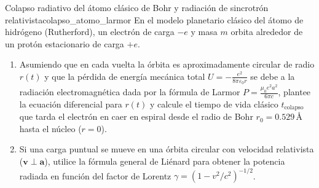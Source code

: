 \documentclass[11pt,a4paper]{book}
\begin{document}
\begin{ejercicio}{Colapso radiativo del átomo clásico de Bohr y radiación de sincrotrón relativista}{colapso_atomo_larmor}
En el modelo planetario clásico del átomo de hidrógeno (Rutherford), un electrón de carga $-e$ y masa $m$ orbita alrededor de un protón estacionario de carga $+e$.
\begin{enumerate}[label=\alph*)]
    \item Asumiendo que en cada vuelta la órbita es aproximadamente circular de radio $r(t)$ y que la pérdida de energía mecánica total $U = -\frac{e^2}{8\pi\varepsilon_0 r}$ se debe a la radiación electromagnética dada por la fórmula de Larmor $P = \frac{\mu_0 e^2 a^2}{6\pi c}$, plantee la ecuación diferencial para $r(t)$ y calcule el tiempo de vida clásico $t_{\text{colapso}}$ que tarda el electrón en caer en espiral desde el radio de Bohr $r_0 = 0.529\,\text{\AA}$ hasta el núcleo ($r = 0$).
    \item Si una carga puntual se mueve en una órbita circular con velocidad relativista ($\bm{v} \perp \bm{a}$), utilice la fórmula general de Liénard para obtener la potencia radiada en función del factor de Lorentz $\gamma = (1 - v^2/c^2)^{-1/2}$.
\end{enumerate}
\end{ejercicio}
\end{document}
